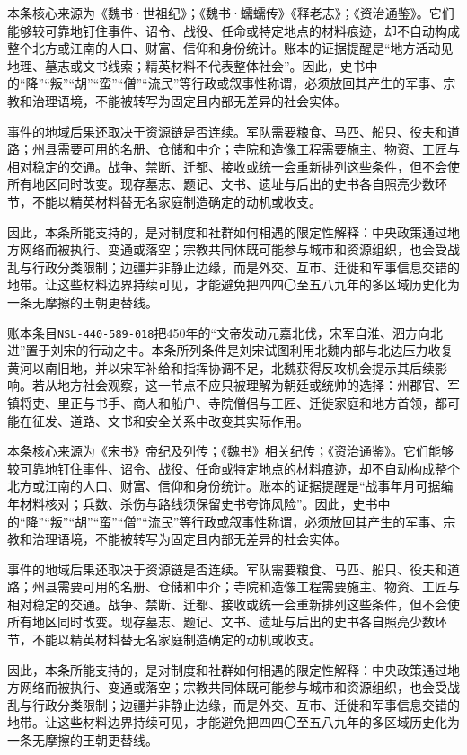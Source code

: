 本条核心来源为《魏书·世祖纪》；《魏书·蠕蠕传》《释老志》；《资治通鉴》。它们能够较可靠地钉住事件、诏令、战役、任命或特定地点的材料痕迹，却不自动构成整个北方或江南的人口、财富、信仰和身份统计。账本的证据提醒是“地方活动见地理、墓志或文书线索；精英材料不代表整体社会”。因此，史书中的“降”“叛”“胡”“蛮”“僧”“流民”等行政或叙事性称谓，必须放回其产生的军事、宗教和治理语境，不能被转写为固定且内部无差异的社会实体。

事件的地域后果还取决于资源链是否连续。军队需要粮食、马匹、船只、役夫和道路；州县需要可用的名册、仓储和中介；寺院和造像工程需要施主、物资、工匠与相对稳定的交通。战争、禁断、迁都、接收或统一会重新排列这些条件，但不会使所有地区同时改变。现存墓志、题记、文书、遗址与后出的史书各自照亮少数环节，不能以精英材料替无名家庭制造确定的动机或收支。

因此，本条所能支持的，是对制度和社群如何相遇的限定性解释：中央政策通过地方网络而被执行、变通或落空；宗教共同体既可能参与城市和资源组织，也会受战乱与行政分类限制；边疆并非静止边缘，而是外交、互市、迁徙和军事信息交错的地带。让这些材料边界持续可见，才能避免把四四〇至五八九年的多区域历史化为一条无摩擦的王朝更替线。

账本条目\texttt{NSL-440-589-018}把450年的“文帝发动元嘉北伐，宋军自淮、泗方向北进”置于刘宋的行动之中。本条所列条件是刘宋试图利用北魏内部与北边压力收复黄河以南旧地，并以宋军补给和指挥协调不足，北魏获得反攻机会提示其后续影响。若从地方社会观察，这一节点不应只被理解为朝廷或统帅的选择：州郡官、军镇将吏、里正与书手、商人和船户、寺院僧侣与工匠、迁徙家庭和地方首领，都可能在征发、道路、文书和安全关系中改变其实际作用。

本条核心来源为《宋书》帝纪及列传；《魏书》相关纪传；《资治通鉴》。它们能够较可靠地钉住事件、诏令、战役、任命或特定地点的材料痕迹，却不自动构成整个北方或江南的人口、财富、信仰和身份统计。账本的证据提醒是“战事年月可据编年材料核对；兵数、杀伤与路线须保留史书夸饰风险”。因此，史书中的“降”“叛”“胡”“蛮”“僧”“流民”等行政或叙事性称谓，必须放回其产生的军事、宗教和治理语境，不能被转写为固定且内部无差异的社会实体。

事件的地域后果还取决于资源链是否连续。军队需要粮食、马匹、船只、役夫和道路；州县需要可用的名册、仓储和中介；寺院和造像工程需要施主、物资、工匠与相对稳定的交通。战争、禁断、迁都、接收或统一会重新排列这些条件，但不会使所有地区同时改变。现存墓志、题记、文书、遗址与后出的史书各自照亮少数环节，不能以精英材料替无名家庭制造确定的动机或收支。

因此，本条所能支持的，是对制度和社群如何相遇的限定性解释：中央政策通过地方网络而被执行、变通或落空；宗教共同体既可能参与城市和资源组织，也会受战乱与行政分类限制；边疆并非静止边缘，而是外交、互市、迁徙和军事信息交错的地带。让这些材料边界持续可见，才能避免把四四〇至五八九年的多区域历史化为一条无摩擦的王朝更替线。

